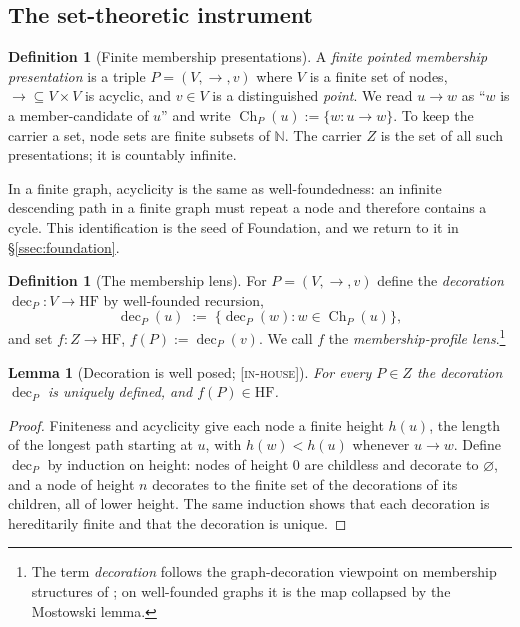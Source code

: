 \documentclass[11pt]{article}
\newcommand{\HF}{\mathrm{HF}}                 \newcommand{\rank}{\operatorname{rank}}
\newcommand{\dec}{\operatorname{dec}}
\newcommand{\Ch}{\operatorname{Ch}}
\newcommand{\gradetag}[1]{\textnormal{\textsc{[#1]}}}
\newcommand{\inhouse}{\gradetag{in-house}}
\newtheorem{lemma}[theorem]{Lemma}
\theoremstyle{definition}
\newtheorem{definition}[theorem]{Definition}
\begin{document}
\subsection{The set-theoretic instrument}

\begin{definition}[Finite membership presentations]\label{def:presentation}
A \emph{finite pointed membership presentation} is a triple $P=(V,\to,v)$ where $V$ is a finite
set of nodes, ${\to}\subseteq V\times V$ is acyclic, and $v\in V$ is a distinguished
\emph{point}. We read $u\to w$ as ``$w$ is a member-candidate of $u$'' and write
$\Ch_P(u):=\{w: u\to w\}$. To keep the carrier a set, node sets are finite subsets of
$\mathbb N$. The carrier $Z$ is the set of all such presentations; it is countably infinite.
\end{definition}

In a finite graph, acyclicity is the same as well-foundedness: an infinite descending path in a
finite graph must repeat a node and therefore contains a cycle. This identification is the seed
of Foundation, and we return to it in \S\ref{ssec:foundation}.

\begin{definition}[The membership lens]\label{def:lens}
For $P=(V,\to,v)$ define the \emph{decoration} $\dec_P\colon V\to\HF$ by well-founded
recursion,
\[
  \dec_P(u)\;:=\;\{\dec_P(w): w\in\Ch_P(u)\},
\]
and set $f\colon Z\to\HF$, $f(P):=\dec_P(v)$. We call $f$ the \emph{membership-profile
lens}.\footnote{The term \emph{decoration} follows the graph-decoration viewpoint on membership
structures of \citet{Aczel1988}; on well-founded graphs it is the map collapsed by the Mostowski
lemma.}
\end{definition}

\begin{lemma}[Decoration is well posed; \inhouse]\label{lem:L1}
For every $P\in Z$ the decoration $\dec_P$ is uniquely defined, and $f(P)\in\HF$.
\end{lemma}

\begin{proof}
Finiteness and acyclicity give each node a finite height $h(u)$, the length of the longest
path starting at $u$, with $h(w)<h(u)$ whenever $u\to w$. Define $\dec_P$ by induction on
height: nodes of height $0$ are childless and decorate to $\varnothing$, and a node of height $n$
decorates to the finite set of the decorations of its children, all of lower height. The same
induction shows that each decoration is hereditarily finite and that the decoration is unique.
\end{proof}
\end{document}
